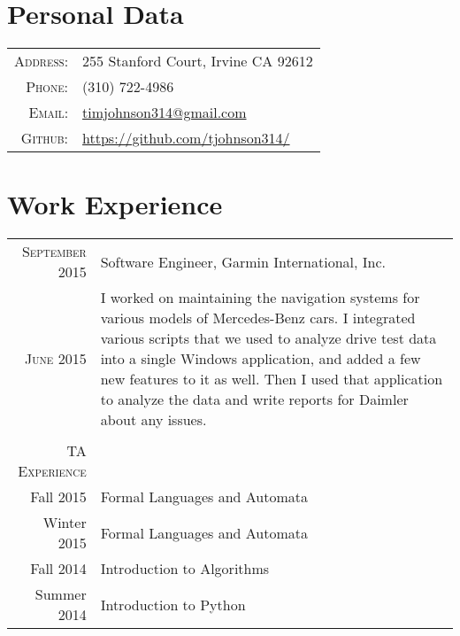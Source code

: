 \documentclass[a4paper,10pt]{article} %
\begin{document}
\pagestyle{empty} %

\par{\par} %

\section{Personal Data}

\begin{tabular}{rl}
\textsc{Address:} & 255 Stanford Court, Irvine CA 92612\\
\textsc{Phone:} & (310) 722-4986\\
\textsc{Email:} & \href{mailto:timjohnson314@gmail.com}{timjohnson314@gmail.com} \\
\textsc{Github:} & \href{https://github.com/tjohnson314/}{https://github.com/tjohnson314/}
\end{tabular}


\section{Work Experience}

\begin{tabular}{r|p{11cm}}

\textsc{September 2015} & Software Engineer, Garmin International, Inc. \\
\textsc{June 2015} & I worked on maintaining the navigation systems for various models of Mercedes-Benz cars. I integrated various scripts that we used to analyze drive test data into a single Windows application, and added a few new features to it as well. Then I used that application to analyze the data and write reports for Daimler about any issues. \\
\multicolumn{2}{c}{} \\


\textsc{TA Experience} & \\
Fall 2015 & Formal Languages and Automata \\
Winter 2015 & Formal Languages and Automata \\
Fall 2014 & Introduction to Algorithms \\
Summer 2014 & Introduction to Python \\

\end{tabular}
\end{document}
